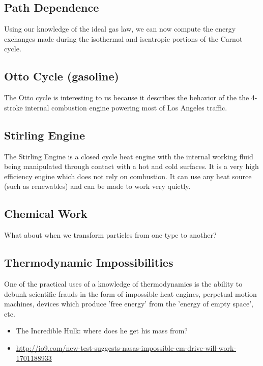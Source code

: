 \subsection{Path Dependence}
Using our knowledge of the ideal gas law, we can now compute the energy exchanges made during the isothermal and isentropic portions of the Carnot cycle.


\subsection{Otto Cycle (gasoline)}
The Otto cycle is interesting to us because it describes the behavior of the the 4-stroke internal combustion engine powering most of Los Angeles traffic.

\subsection{Stirling Engine}
The Stirling Engine is a closed cycle heat engine with the internal working fluid being manipulated through contact with a hot and cold surfaces. It is a very high efficiency engine which does not rely on combustion. It can use any heat source (such as renewables) and can be made to work very quietly. 


\subsection{Chemical Work}
What about when we transform particles from one type to another?


\subsection{Thermodynamic Impossibilities}
One of the practical uses of a knowledge of thermodynamics is the ability to debunk scientific frauds in the form of impossible heat engines, perpetual motion machines, devices which produce 'free energy' from the 'energy of empty space', etc.

\begin{itemize}
\item The Incredible Hulk: where does he get his mass from?

\item \url{http://io9.com/new-test-suggests-nasas-impossible-em-drive-will-work-1701188933}


\end{itemize}